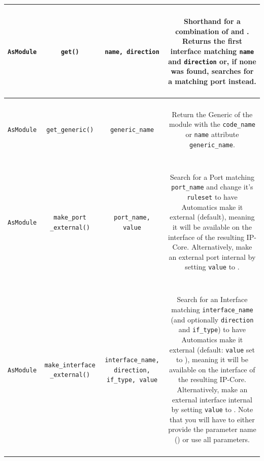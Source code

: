 \begin{longtable}[htbp]{|c|c|c|c|}
\hline
\parbox{2.5cm}{~\\ \texttt{AsModule}\\~} & \parbox{3cm}{~\\ \texttt{get()}\\~} & \parbox{3cm}{~ \\ \texttt{name, direction} \\ ~} & \parbox{6cm}{~\\ Shorthand for a combination of  and . Returns the first interface matching \texttt{name} and \texttt{direction} or, if none was found, searches for a matching port instead.\\~}\\
\hline
\parbox{2.5cm}{~\\ \texttt{AsModule}\\~} & \parbox{3cm}{~\\ \texttt{get\_generic()}\\~} & \parbox{3cm}{~ \\ \texttt{generic\_name} \\ ~} & \parbox{6cm}{~\\ Return the Generic of the module with the \texttt{code\_name} or \texttt{name} attribute \texttt{generic\_name}. \\~}\\
\hline
\parbox{2.5cm}{~\\ \texttt{AsModule}\\~} & \parbox{3cm}{~\\ \texttt{make\_port \_external()}\\~} & \parbox{3cm}{~ \\ \texttt{port\_name, value} \\ ~} & \parbox{6cm}{~\\ Search for a Port matching \texttt{port\_name} and change it's \texttt{ruleset} to have Automatics make it external (default), meaning it will be available on the interface of the resulting IP-Core. Alternatively, make an external port internal by setting \texttt{value} to . \\~}\\
\hline
\parbox{2.5cm}{~\\ \texttt{AsModule}\\~} & \parbox{3cm}{~\\ \texttt{make\_interface \_external()}\\~} & \parbox{3cm}{~ \\ \texttt{interface\_name, direction, if\_type, value} \\ ~} & \parbox{6cm}{~\\ Search for an Interface matching \texttt{interface\_name} (and optionally \texttt{direction} and \texttt{if\_type}) to have Automatics make it external (default: \texttt{value} set to ), meaning it will be available on the interface of the resulting IP-Core. Alternatively, make an external interface internal by setting \texttt{value} to . Note that you will have to either provide the parameter name () or use all parameters. \\~}\\
\hline


\end{longtable}
